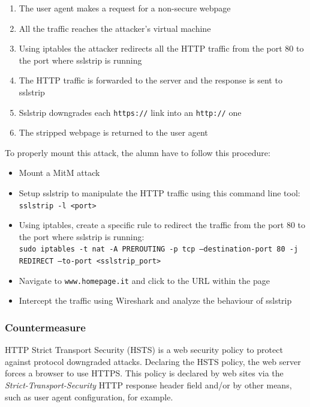 \documentclass[final]{article}
\begin{document}
\begin{enumerate}
  \item The user agent makes a request for a non-secure webpage
  \item All the traffic reaches the attacker's virtual machine
  \item Using iptables the attacker redirects all the HTTP traffic from the port 80 to the port where sslstrip is running
  \item The HTTP traffic is forwarded to the server and the response is sent to sslstrip
  \item Sslstrip downgrades each \texttt{https://} link into an \texttt{http://} one
  \item The stripped webpage is returned to the user agent
\end{enumerate}

\noindent To properly mount this attack, the alumn have to follow this procedure:
\begin{itemize}
  \item Mount a \ac{MitM} attack
  \item Setup sslstrip to manipulate the HTTP traffic using this command line tool: \texttt{sslstrip -l <port>}
  \item Using iptables, create a specific rule to redirect the traffic from the port 80 to the port where sslstrip is running:\\
  \texttt{sudo iptables -t nat -A PREROUTING -p tcp --destination-port 80 -j REDIRECT --to-port <sslstrip\_port>}
  \item Navigate to \texttt{www.homepage.it} and click to the URL within the page
  \item Intercept the traffic using Wireshark and analyze the behaviour of sslstrip
\end{itemize}

\subsubsection{Countermeasure}
HTTP Strict Transport Security (HSTS) is a web security policy to protect against protocol downgraded attacks.
Declaring the HSTS policy, the web server forces a browser to use HTTPS.
This policy is declared by web sites via the \textit{Strict-Transport-Security} HTTP response header field and/or by other means, such as user agent configuration, for example. \cite{hodges2012http}
\newpage
\end{document}
